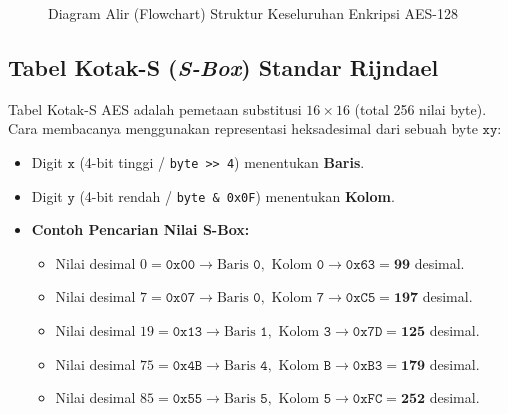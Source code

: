 \documentclass[11pt,a4paper]{article}
\begin{document}
\begin{figure}[H]
\caption{Diagram Alir (Flowchart) Struktur Keseluruhan Enkripsi AES-128}
\label{fig:aes_flowchart}
\end{figure}

\subsection{Tabel Kotak-S (\textit{S-Box}) Standar Rijndael}
Tabel Kotak-S AES adalah pemetaan substitusi $16 \times 16$ (total 256 nilai byte). Cara membacanya menggunakan representasi heksadesimal dari sebuah byte $\mathtt{xy}$:
\begin{itemize}[leftmargin=*]
    \item Digit $\mathtt{x}$ (4-bit tinggi / \texttt{byte >> 4}) menentukan \textbf{Baris}.
    \item Digit $\mathtt{y}$ (4-bit rendah / \texttt{byte \& 0x0F}) menentukan \textbf{Kolom}.
    \item \textbf{Contoh Pencarian Nilai S-Box:}
    \begin{itemize}
        \item Nilai desimal $0 = \mathtt{0x00} \longrightarrow \text{Baris } \mathtt{0}, \text{ Kolom } \mathtt{0} \longrightarrow \mathtt{0x63} = \mathbf{99}$ desimal.
        \item Nilai desimal $7 = \mathtt{0x07} \longrightarrow \text{Baris } \mathtt{0}, \text{ Kolom } \mathtt{7} \longrightarrow \mathtt{0xC5} = \mathbf{197}$ desimal.
        \item Nilai desimal $19 = \mathtt{0x13} \longrightarrow \text{Baris } \mathtt{1}, \text{ Kolom } \mathtt{3} \longrightarrow \mathtt{0x7D} = \mathbf{125}$ desimal.
        \item Nilai desimal $75 = \mathtt{0x4B} \longrightarrow \text{Baris } \mathtt{4}, \text{ Kolom } \mathtt{B} \longrightarrow \mathtt{0xB3} = \mathbf{179}$ desimal.
        \item Nilai desimal $85 = \mathtt{0x55} \longrightarrow \text{Baris } \mathtt{5}, \text{ Kolom } \mathtt{5} \longrightarrow \mathtt{0xFC} = \mathbf{252}$ desimal.
    \end{itemize}
\end{itemize}
\end{document}
